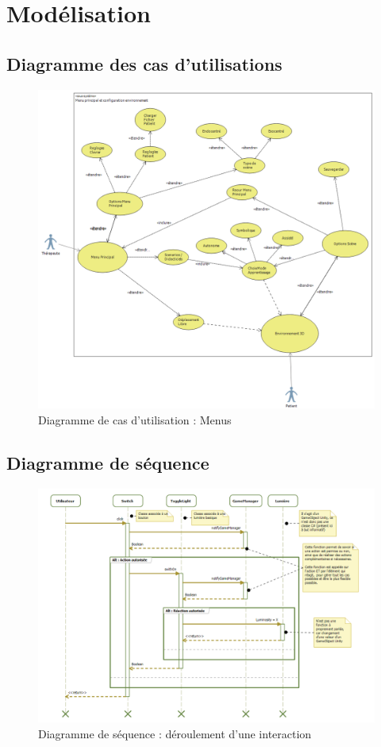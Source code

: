\section{\label{modelisation}Modélisation}

\subsection{Diagramme des cas d’utilisations}
\begin{figure}[H]
    \centering
    \includegraphics[width=\textwidth]{4-Conception/img/diagCasUsage.png}
    \caption{Diagramme de cas d'utilisation : Menus}
\end{figure}

\subsection{Diagramme de séquence}
\begin{figure}[H]
    \centering
    \includegraphics[width=\textwidth]{4-Conception/img/diagSequenceLight.png}
    \caption{Diagramme de séquence : déroulement d'une interaction}
    \label{fig:sequence_diagram}
\end{figure}

